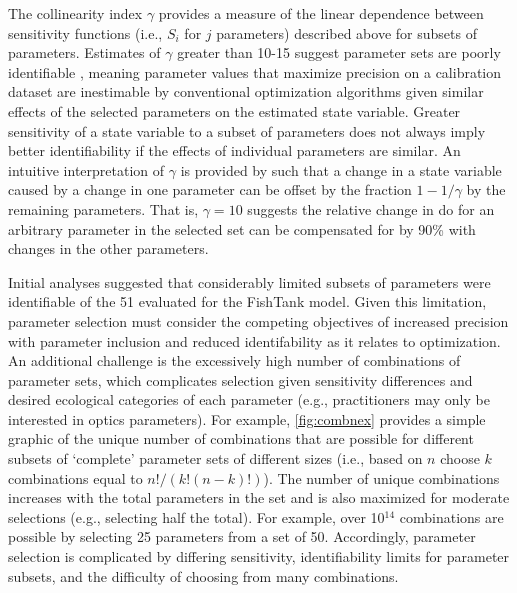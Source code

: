 \documentclass[letterpaper,12pt,oneside]{article}\usepackage[]{graphicx}\usepackage[]{color}
\begin{document}
The collinearity index $\gamma$ provides a measure of the linear dependence between sensitivity functions (i.e., $S_i$ for $j$ parameters) described above for subsets of parameters. Estimates of $\gamma$ greater than 10-15 suggest parameter sets are poorly identifiable \citep{Brun01,Omlin01}, meaning parameter values that maximize precision on a calibration dataset are inestimable by conventional optimization algorithms given similar effects of the selected parameters on the estimated state variable. Greater sensitivity of a state variable to a subset of parameters does not always imply better identifiability if the effects of individual parameters are similar.  An intuitive interpretation of $\gamma$ is provided by \citet{Brun01} such that a change in a state variable caused by a change in one parameter can be offset by the fraction $1 - 1/\gamma$ by the remaining parameters.  That is, $\gamma = 10$ suggests the relative change in \ac{do} for an arbitrary parameter in the selected set can be compensated for by 90\% with changes in the other parameters. 

Initial analyses suggested that considerably limited subsets of parameters were identifiable of the 51 evaluated for the FishTank model.  Given this limitation, parameter selection must consider the competing objectives of increased precision with parameter inclusion and reduced identifability as it relates to optimization.  An additional challenge is the excessively high number of combinations of parameter sets, which complicates selection given sensitivity differences and desired ecological categories of each parameter (e.g., practitioners may only be interested in optics parameters).  For example, \cref{fig:combnex} provides a simple graphic of the unique number of combinations that are possible for different subsets of `complete' parameter sets of different sizes (i.e., based on $n$ choose $k$ combinations equal to $n!/\left(k!\left(n-k\right)!\right)$).  The number of unique combinations increases with the total parameters in the set and is also maximized for moderate selections (e.g., selecting half the total).  For example, over 10$^{14}$ combinations are possible by selecting 25 parameters from a set of 50.  Accordingly, parameter selection is complicated by differing sensitivity, identifiability limits for parameter subsets, and the difficulty of choosing from many combinations.
\end{document}
